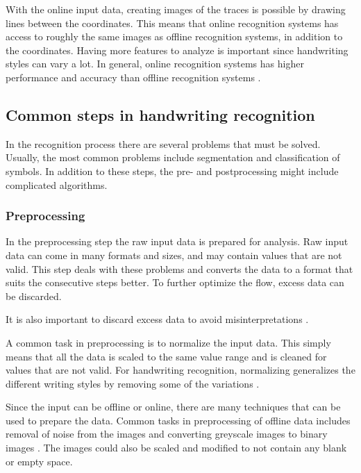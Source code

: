With the online input data, creating images of the traces is possible by drawing lines between the coordinates. This means that online recognition systems has access to roughly the same images as offline recognition systems, in addition to the coordinates. Having more features to analyze is important since handwriting styles can vary a lot. In general, online recognition systems has higher performance and accuracy than offline recognition systems \parencite{priya_online_2016}.

\subsection{Common steps in handwriting recognition}

In the recognition process there are several problems that must be solved. Usually, the most common problems include segmentation and classification of symbols. In addition to these steps, the pre- and postprocessing might include complicated algorithms.

\subsubsection{Preprocessing}

In the preprocessing step the raw input data is prepared for analysis. Raw input data can come in many formats and sizes, and may contain values that are not valid. This step deals with these problems and converts the data to a format that suits the consecutive steps better. To further optimize the flow, excess data can be discarded.

It is also important to discard excess data to avoid misinterpretations \parencite{huang_preprocessing_2007}.

A common task in preprocessing is to normalize the input data. This simply means that all the data is scaled to the same value range and is cleaned for values that are not valid. For handwriting recognition, normalizing generalizes the different writing styles by removing some of the variations \parencite{huang_preprocessing_2007}.

Since the input can be offline or online, there are many techniques that can be used to prepare the data. Common tasks in preprocessing of offline data includes removal of noise from the images and converting greyscale images to binary images \cite{priya_online_2016}. The images could also be scaled and modified to not contain any blank or empty space.

